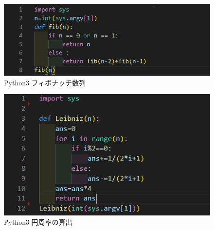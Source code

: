 \begin{figure}[tb]
    \centering
    \includegraphics[width=13.5cm,keepaspectratio]{figure/f-py.PNG}
    \caption{Python3 フィボナッチ数列}
    \label{fig:f-py}
\end{figure}

\begin{figure}[tb]
    \centering
    \includegraphics[width=13.5cm,keepaspectratio]{figure/p-py.PNG}
    \caption{Python3 円周率の算出}
    \label{fig:p-py}
\end{figure}

